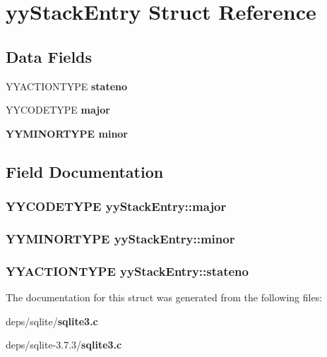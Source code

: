 \section{yy\-Stack\-Entry Struct Reference}
\label{structyyStackEntry}
\subsection*{Data Fields}
\begin{CompactItemize}
\item 
YYACTIONTYPE \bf{stateno}
\item 
YYCODETYPE \bf{major}
\item 
\bf{YYMINORTYPE} \bf{minor}
\end{CompactItemize}


\subsection{Field Documentation}
\subsubsection{\setlength{\rightskip}{0pt plus 5cm}YYCODETYPE \bf{yy\-Stack\-Entry::major}}\label{structyyStackEntry_eaa8b0823b7f775d5097e56a5b319d29}


\subsubsection{\setlength{\rightskip}{0pt plus 5cm}\bf{YYMINORTYPE} \bf{yy\-Stack\-Entry::minor}}\label{structyyStackEntry_8fb8a21c5353a39d636494483ae62fc0}


\subsubsection{\setlength{\rightskip}{0pt plus 5cm}YYACTIONTYPE \bf{yy\-Stack\-Entry::stateno}}\label{structyyStackEntry_f39ef0377c08c6fe7dca2f29e5c9cde0}




The documentation for this struct was generated from the following files:\begin{CompactItemize}
\item 
deps/sqlite/\bf{sqlite3.c}\item 
deps/sqlite-3.7.3/\bf{sqlite3.c}\end{CompactItemize}
